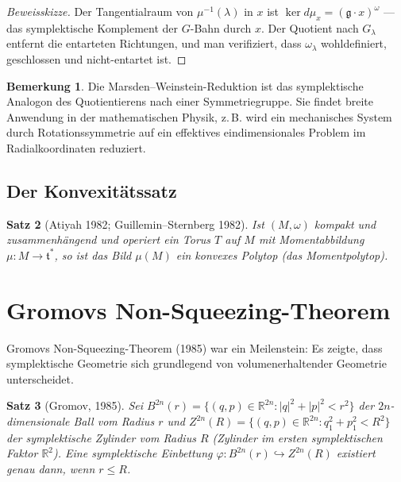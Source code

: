 \documentclass[12pt,a4paper]{amsart}
\newtheorem{theorem}{Satz}[section]
\theoremstyle{definition}
\newtheorem{bemerkung}[theorem]{Bemerkung}
\begin{document}
\begin{proof}[Beweisskizze]
Der Tangentialraum von $\mu^{-1}(\lambda)$ in $x$ ist $\ker d\mu_x =
(\mathfrak{g} \cdot x)^{\omega}$ --- das symplektische Komplement der
$G$-Bahn durch $x$.  Der Quotient nach $G_\lambda$ entfernt die entarteten
Richtungen, und man verifiziert, dass $\omega_\lambda$ wohldefiniert, geschlossen
und nicht-entartet ist.
\end{proof}

\begin{bemerkung}
Die Marsden--Weinstein-Reduktion ist das symplektische Analogon des Quotientierens
nach einer Symmetriegruppe.  Sie findet breite Anwendung in der mathematischen
Physik, z.\,B. wird ein mechanisches System durch Rotationssymmetrie auf ein
effektives eindimensionales Problem im Radialkoordinaten reduziert.
\end{bemerkung}

\subsection{Der Konvexitätssatz}

\begin{theorem}[Atiyah 1982; Guillemin--Sternberg 1982]
Ist $(M, \omega)$ kompakt und zusammenhängend und operiert ein Torus $T$ auf
$M$ mit Momentabbildung $\mu: M \to \mathfrak{t}^*$, so ist das Bild $\mu(M)$
ein konvexes Polytop (das \emph{Momentpolytop}).
\end{theorem}

\section{Gromovs Non-Squeezing-Theorem}
\label{sec:gromov}

Gromovs Non-Squeezing-Theorem (1985) war ein Meilenstein: Es zeigte, dass
symplektische Geometrie sich grundlegend von volumenerhaltender Geometrie
unterscheidet.

\begin{theorem}[Gromov, 1985]\label{thm:gromov}
Sei $B^{2n}(r) = \{(q,p) \in \mathbb{R}^{2n} : |q|^2 + |p|^2 < r^2\}$
der $2n$-dimensionale Ball vom Radius $r$ und
$Z^{2n}(R) = \{(q,p) \in \mathbb{R}^{2n} : q_1^2 + p_1^2 < R^2\}$
der symplektische Zylinder vom Radius $R$ (Zylinder im ersten symplektischen
Faktor $\mathbb{R}^2$).  Eine symplektische Einbettung
$\varphi: B^{2n}(r) \hookrightarrow Z^{2n}(R)$ existiert genau dann, wenn
$r \leq R$.
\end{theorem}
\end{document}
